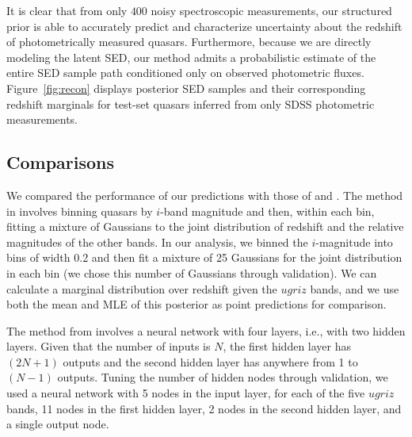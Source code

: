 \documentclass{article} %
\begin{document}
It is clear that from only $400$ noisy spectroscopic measurements, our structured prior is able to accurately predict and characterize uncertainty about the redshift of photometrically measured quasars.  
Furthermore, because we are directly modeling the latent SED, our method admits a probabilistic estimate of the entire SED sample path conditioned only on observed photometric fluxes.
Figure~\ref{fig:recon} displays posterior SED samples and their corresponding redshift marginals for test-set quasars inferred from only SDSS photometric measurements.  

\subsection{Comparisons}

We compared the performance of our predictions with those of \cite{bovy2012photometric} and \cite{brescia2013photometric}. The method in \cite{bovy2012photometric} involves binning
quasars by $i$-band magnitude and then, within each bin,
fitting a mixture of Gaussians to the joint distribution of
redshift and the relative magnitudes of the other bands. In our analysis, we binned
the $i$-magnitude
into bins of width 0.2 and then fit a mixture of 25 Gaussians for the joint distribution in each bin
(we chose this number of Gaussians through validation). We can calculate a marginal distribution
over redshift given the $ugriz$ bands, and we use both the mean and MLE of this posterior as
point predictions for comparison.


The method from \cite{brescia2013photometric} involves a neural network with four layers, i.e.,
with two hidden layers. Given that the number of inputs is $N$, the first hidden layer has
$(2N + 1)$ outputs and the second hidden layer has anywhere from 1 to $(N - 1)$ outputs. Tuning
the number of hidden nodes through validation, we used a neural network with 5 nodes
in the input layer, for each of the five $ugriz$ bands, 11 nodes in the first hidden layer, 2 nodes
in the second hidden layer, and a single output node.



\end{document}
